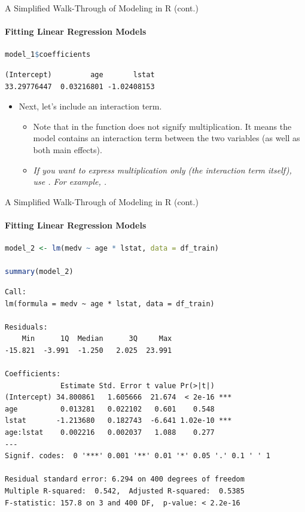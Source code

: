 \begin{frame}[fragile]{A Simplified Walk-Through of Modeling in R (cont.)}
\framesubtitle{Fitting Linear Regression Models}
\begin{lstlisting}[language=R]
model_1$coefficients
\end{lstlisting}
\begin{lstlisting}[style=output]
(Intercept)         age       lstat 
33.29776447  0.03216801 -1.02408153
\end{lstlisting}
\begin{itemize}
  \item Next, let’s include an interaction term.
  \begin{itemize}
    \item Note that \code{*} in the  function does not signify multiplication. It means the model contains an interaction term between the two variables (as well as both main effects).
    \item \textit{If you want to express multiplication only (the interaction term itself), use \code{:}. For example, .}
  \end{itemize}
\end{itemize}
\end{frame}

\begin{frame}[fragile]{A Simplified Walk-Through of Modeling in R (cont.)}
\framesubtitle{Fitting Linear Regression Models}
\begin{lstlisting}[language=R]
model_2 <- lm(medv ~ age * lstat, data = df_train)

summary(model_2)
\end{lstlisting}
\begin{lstlisting}[style=output,basicstyle=\ttfamily\tiny\color{black!75}]
Call:
lm(formula = medv ~ age * lstat, data = df_train)

Residuals:
    Min      1Q  Median      3Q     Max 
-15.821  -3.991  -1.250   2.025  23.991 

Coefficients:
             Estimate Std. Error t value Pr(>|t|)    
(Intercept) 34.800861   1.605666  21.674  < 2e-16 ***
age          0.013281   0.022102   0.601    0.548    
lstat       -1.213680   0.182743  -6.641 1.02e-10 ***
age:lstat    0.002216   0.002037   1.088    0.277    
---
Signif. codes:  0 '***' 0.001 '**' 0.01 '*' 0.05 '.' 0.1 ' ' 1

Residual standard error: 6.294 on 400 degrees of freedom
Multiple R-squared:  0.542,  Adjusted R-squared:  0.5385 
F-statistic: 157.8 on 3 and 400 DF,  p-value: < 2.2e-16
\end{lstlisting}
\end{frame}

